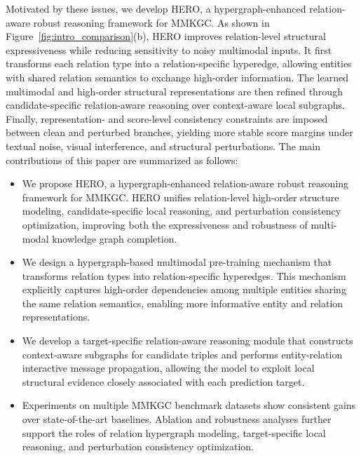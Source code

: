 \documentclass[a4paper,fleqn]{cas-sc}
\begin{document}
Motivated by these issues, we develop HERO, a hypergraph-enhanced relation-aware robust reasoning framework for MMKGC. As shown in Figure~\ref{fig:intro_comparison}(b), HERO improves relation-level structural expressiveness while reducing sensitivity to noisy multimodal inputs. It first transforms each relation type into a relation-specific hyperedge, allowing entities with shared relation semantics to exchange high-order information. The learned multimodal and high-order structural representations are then refined through candidate-specific relation-aware reasoning over context-aware local subgraphs. Finally, representation- and score-level consistency constraints are imposed between clean and perturbed branches, yielding more stable score margins under textual noise, visual interference, and structural perturbations.
The main contributions of this paper are summarized as follows:

\begin{itemize}
    \item We propose HERO, a hypergraph-enhanced relation-aware robust reasoning framework for MMKGC. HERO unifies relation-level high-order structure modeling, candidate-specific local reasoning, and perturbation consistency optimization, improving both the expressiveness and robustness of multi-modal knowledge graph completion.

    \item We design a hypergraph-based multimodal pre-training mechanism that transforms relation types into relation-specific hyperedges. This mechanism explicitly captures high-order dependencies among multiple entities sharing the same relation semantics, enabling more informative entity and relation representations.

    \item We develop a target-specific relation-aware reasoning module that constructs context-aware subgraphs for candidate triples and performs entity-relation interactive message propagation, allowing the model to exploit local structural evidence closely associated with each prediction target.

    \item Experiments on multiple MMKGC benchmark datasets show consistent gains over state-of-the-art baselines. Ablation and robustness analyses further support the roles of relation hypergraph modeling, target-specific local reasoning, and perturbation consistency optimization.


\end{itemize}
\end{document}
